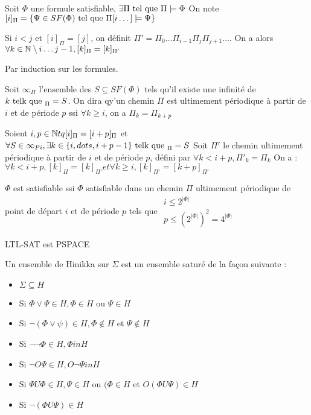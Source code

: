 \documentclass[10pt,a4paper]{article}
\begin{document}
\begin{prop}
 Soit $\Phi$ une formule satisfiable, $\exists \Pi \tq \Pi \models \Phi$
On note $[i]_{\Pi} = \{\Psi \in SF(\Phi) \tq \Pi[i \dots] \models \Psi \}$
\end{prop}

\begin{lem}[1]
 Si $i < j$ et $[i]_{\Pi} = [j]$, on définit $\Pi' = \Pi_0 \dots \Pi_{i-1} \Pi_j \Pi_{j+1} \dots$. On a alors 
$\forall k \in \Ns \setminus { i \dots j-1}, [k]_{\Pi} = [k]_{\Pi'}$
\end{lem}
\begin{dem}
 Par induction sur les formules.
\end{dem}
\begin{definition}
 Soit $\infty_{\Pi}$ l'ensemble des $S \subseteq SF(\Phi)$ tels qu'il existe une infinité de $k \tq [k]_{\Pi} = S$. On dira qy'un chemin $\Pi$ est ultimement périodique à partir de $i$ et de période $p$ ssi $\forall k \geq i$, on a $\Pi_k = \Pi_{k+p}$
\end{definition}

\begin{lem}[2]
 Soient $i, p \in \Ns tq [i]_{\Pi} = [i+p]_{\Pi}$ et $\forall S \in \infty_{Pi}, \exists k \in \{i, dots, i+p-1 \} \tq [k]_{\Pi} = S$
Soit $\Pi'$ le chemin ultimement périodique à partir de $i$ et de période $p$, défini par $\forall k < i+p, \Pi'_k = \Pi_k$
On a : $\forall k < i+p, [k]_{\Pi} = [k]_{\Pi'} et \forall k \geq i, [k]_{\Pi'} = [k+p]_{\Pi'}$
\end{lem}

\begin{thm}
 $\Phi$ est satisfiable ssi $\Phi$ satisfiable dans un chemin $\Pi$ ultimement périodique de point de départ $i$ et de période $p$ tels que $\begin{array}{ll}
    i \leq 2^{ | \Phi | }\\
    p \leq (2^{ | \Phi | })^2 = 4^{ | \Phi | }
 \end{array}$

\end{thm}


\begin{thm}
 LTL-SAT est PSPACE
\end{thm}


\begin{definition}
 Un ensemble de Hinikka sur $\Sigma$ est un ensemble saturé de la façon suivante :
\begin{itemize}
 \item $\Sigma \subseteq H$
 \item Si $\Phi \vee \Psi \in H, \Phi \in H$ ou $\Psi \in H$
 \item Si $\lnot (\Phi \vee \psi) \in H, \Phi \not \in H$ et $\Psi \not \in H$
 \item Si $\lnot \lnot \Phi \in H, \Phi in H$
 \item Si $\lnot O \Psi \in H, O \lnot \Psi in H$
 \item Si $\Psi U \Phi \in H, \Psi \in H$ ou $(\Phi \in H$ et $O (\Phi U \Psi ) \in H$
 \item Si $\lnot (\Phi U \Psi) \in H$
\end{itemize}

\end{definition}
\end{document}
